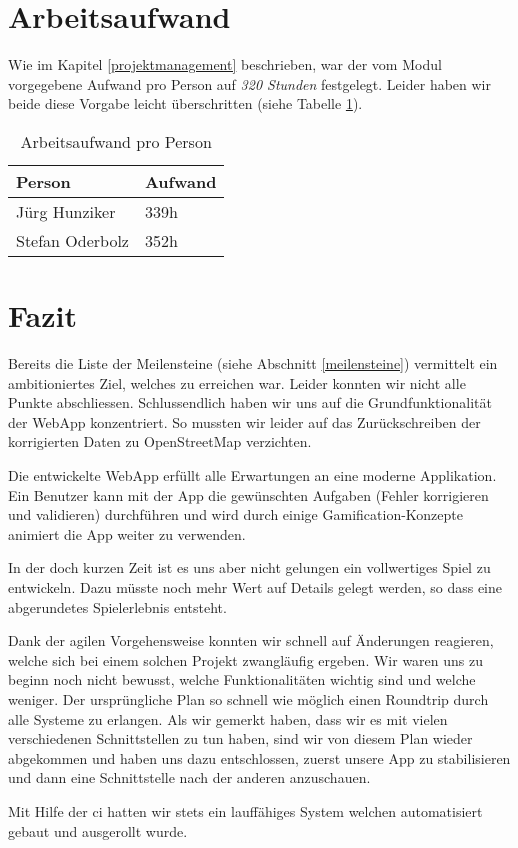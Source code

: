 \section{Arbeitsaufwand}
Wie im Kapitel \ref{projektmanagement} beschrieben, war der vom Modul vorgegebene Aufwand pro Person auf \emph{320 Stunden} festgelegt. Leider haben wir beide diese Vorgabe leicht überschritten (siehe Tabelle \ref{projektmanagement-arbeitsaufwand}).

\begin{table}[H]
\centering
\begin{tabular}{|l|l|}
\hline 
\textbf{Person} & \textbf{Aufwand} \\ 
\hline 
Jürg Hunziker & 339h \\
\hline 
Stefan Oderbolz & 352h \\  
\hline 
\end{tabular}
\caption{Arbeitsaufwand pro Person}
\label{projektmanagement-arbeitsaufwand}
\end{table} 

\section{Fazit}
\label{fazit}
Bereits die Liste der Meilensteine (siehe Abschnitt \ref{meilensteine}) vermittelt ein ambitioniertes Ziel, welches zu erreichen war.
Leider konnten wir nicht alle Punkte abschliessen.
Schlussendlich haben wir uns auf die Grundfunktionalität der \gls{WebApp} konzentriert.
So mussten wir leider auf das Zurückschreiben der korrigierten Daten zu \gls{OpenStreetMap} verzichten.

Die entwickelte \gls{WebApp} erfüllt alle Erwartungen an eine moderne Applikation.
Ein Benutzer kann mit der App die gewünschten Aufgaben (Fehler korrigieren und validieren) durchführen und wird durch einige Gamification-Konzepte animiert die App weiter zu verwenden.

In der doch kurzen Zeit ist es uns aber nicht gelungen ein vollwertiges Spiel zu entwickeln.
Dazu müsste noch mehr Wert auf Details gelegt werden, so dass eine abgerundetes Spielerlebnis entsteht.

Dank der agilen Vorgehensweise konnten wir schnell auf Änderungen reagieren, welche sich bei einem solchen Projekt zwangläufig ergeben.
Wir waren uns zu beginn noch nicht bewusst, welche Funktionalitäten wichtig sind und welche weniger.
Der ursprüngliche Plan so schnell wie möglich einen Roundtrip durch alle Systeme zu erlangen.
Als wir gemerkt haben, dass wir es mit vielen verschiedenen Schnittstellen zu tun haben, sind wir von diesem Plan wieder abgekommen und haben uns dazu entschlossen, zuerst unsere App zu stabilisieren und dann eine Schnittstelle nach der anderen anzuschauen.

Mit Hilfe der \gls{ci} hatten wir stets ein lauffähiges System welchen automatisiert gebaut und ausgerollt wurde.